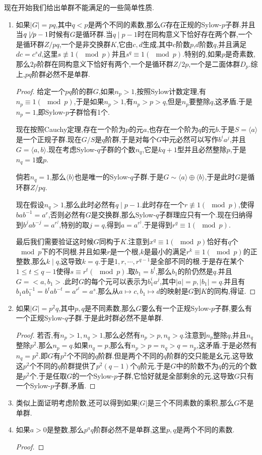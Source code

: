 现在开始我们给出单群不能满足的一些简单性质.
\begin{enumerate}
	\item 如果$|G|=pq$,其中$q<p$是两个不同的素数,那么$G$存在正规的Sylow-$p$子群.并且当$q\not\mid p-1$时候有$G$是循环群.当$q\mid p-1$时在同构意义下恰好存在两个群,一个是循环群$Z/pq$,一个是非交换群$K$,它由$c,d$生成,其中$c$阶数$p$,$d$阶数$q$,并且满足$dc=c^sd$,这里$s\not\equiv1(\mod p)$并且$s^q\equiv1(\mod p)$.特别的,如果$p$是奇素数,那么$2p$阶群在同构意义下恰好有两个,一个是循环群$Z/2p$,一个是二面体群$D_p$.综上,$pq$阶群必然不是单群.
	\begin{proof}
		
		给定一个$pq$阶的群$G$,如果$n_p>1$,按照Sylow计数定理,有$n_p\equiv1(\mod p)$,于是如果$n_p>1$,有$n_p>p>q$,但是$n_p$要整除$q$,这矛盾.于是$n_p=1$,即Sylow-$p$子群恰有1个.
		
		现在按照Cauchy定理,存在一个阶为$p$的元$a$,也存在一个阶为$q$的元$b$.于是$S=\langle a\rangle$是一个正规子群.现在$G/S$是$q$阶群,于是对每个$G$中元必然可以写作$b^ia^j$,并且$G=\langle a,b\rangle$.现在考虑Sylow-$q$子群的个数$n_q$,它是$kq+1$型并且必然整除$p$,于是$n_q=1$或$p$.
		
		倘若$n_q=1$,那么$\langle b\rangle$也是唯一的Sylow-$q$子群.于是$G\sim \langle a\rangle\oplus\langle b\rangle$,于是此时$G$是循环群$Z/pq$.
		
		现在假设$n_q>1$,那么此时必然有$q\mid p-1$.此时存在一个$r\not\equiv1(\mod p)$,使得$bab^{-1}=a^r$,否则必然有$G$是交换群,那么Sylow-$q$子群理应只有一个.现在归纳得到$b^jab^ {-j}=a^{r^j}$,特别的取$j=q$,得到$a=a^{r^j}$.于是得到$r^q\equiv1(\mod p)$.
		
		最后我们需要验证这时候$G$同构于$K$.注意到$x^q\equiv1(\mod p)$恰好有$q$个$\mod p$下的不同根.并且如果$r$是一个根,$k$是最小的满足$r^k\equiv1(\mod p)$的正整数,那么$k\mid q$,这导致$k=q$.于是$1,r,\cdots,r^{q-1}$是全部不同的根.于是存在某个$1\le t\le q-1$使得$s\equiv r^t(\mod p)$.取$b_1=b^t$,那么$b_1$的阶仍然是$q$.并且$G=<a,b_1>$.此时$G$的每个元可以表示为$b_1^ia^j$,其中$|a|=p,|b_1|=q$.并且有$b_1ab_1^{-1}=b^tab^{-t}=a^{r^t}=a^s$.那么从$a\mapsto c,b_1\mapsto d$的映射是$G$到$K$的同构,得证.
	\end{proof}
	\item 如果$|G|=p^2q$,其中$p,q$是不同素数,那么$G$要么有一个正规Sylow-$p$子群,要么有一个正规Sylow-$q$子群.于是此时群必然不是单群.
	\begin{proof}
		
		若否,有$n_p>1,n_q>1$,那么必然有$n_p>p,n_q>q$.注意到$n_p$整除$q$,并且$n_q$整除$p^2$.那么$n_p=q$.如果$n_q=p$,那么有$n_p>p=n_q>q=n_p$,这矛盾.于是必然有$n_q=p^2$.即$G$有$p^2$个不同的$q$阶群.但是两个不同的$q$阶群的交只能是幺元,这导致这$p^2$个不同的$q$阶群提供了$p^2(q-1)$个$q$阶元.于是$G$中的阶数不为$q$的元的个数是$p^2$个.于是任取$G$的一个Sylow-$p$子群,它恰好就是全部剩余的元,这导致$G$只有一个Sylow-$p$子群,矛盾.
	\end{proof}
	\item 类似上面证明考虑阶数,还可以得到如果$|G|$是三个不同素数的乘积,那么$G$不是单群.
	\item 如果$a>0$是整数,那么$p^aq$阶群必然不是单群,这里$p,q$是两个不同的素数.
	\begin{proof}
		

\end{proof}
\end{enumerate}
